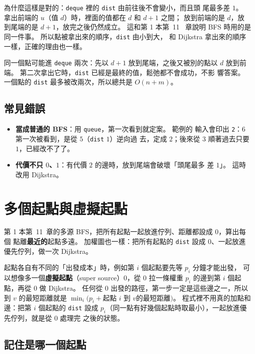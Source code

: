 為什麼這樣是對的：\texttt{deque} 裡的 \texttt{dist} 由前往後不會變小，而且頭
尾最多差 $1$。 拿出前端的 $u$（值 $d$）時，裡面的值都在 $d$ 和 $d + 1$ 之間；
放到前端的是 $d$，放到尾端的是 $d + 1$，放完之後仍然成立。 這和第 1 本第~11~
章說明 BFS 時用的是同一件事。 所以點被拿出來的順序，\texttt{dist} 由小到大，
和 Dijkstra 拿出來的順序一樣，正確的理由也一樣。

同一個點可能進 \texttt{deque} 兩次：先以 $d + 1$ 放到尾端，之後又被別的點以 $d$
放到前端。 第二次拿出它時，\texttt{dist} 已經是最終的值，鬆弛都不會成功，不影
響答案。 一個點的 \texttt{dist} 最多被改兩次，所以總共是 $O(n + m)$。

\subsection{常見錯誤}

\begin{itemize}
\item \textbf{當成普通的 BFS}：用 \texttt{queue}，第一次看到就定案。 範例的
輸入會印出 \texttt{2}：$6$ 第一次被看到，是從 $5$（\texttt{dist} $1$）逆向過
去，定成 $2$；後來從 $3$ 順著過去只要 $1$，已經改不了了。
\item \textbf{代價不只 $0$、$1$}：有代價 $2$ 的邊時，放到尾端會破壞「頭尾最多
差 $1$」。 這時改用 Dijkstra。
\end{itemize}

\section{多個起點與虛擬起點}
\label{sec:sp-multi}

第 1 本第~11~章的多源 BFS，把所有起點一起放進佇列、距離都設成 $0$，算出每個
點離\textbf{最近的}起點多遠。 加權圖也一樣：把所有起點的 \texttt{dist} 設成
$0$、一起放進優先佇列，做一次 Dijkstra。

起點各自有不同的「出發成本」時，例如第 $i$ 個起點要先等 $p_i$ 分鐘才能出發，
可以想像多一個\textbf{虛擬起點}（super source）$0$，從 $0$ 拉一條權重 $p_i$ 的邊到第 $i$ 個起
點，再從 $0$ 做 Dijkstra。 任何從 $0$ 出發的路徑，第一步一定是這些邊之一，所以
到 $v$ 的最短距離就是 $\min_i \bigl(p_i + \text{起點 } i \text{ 到 } v \text{
的最短距離}\bigr)$。 程式裡不用真的加點和邊：把第 $i$ 個起點的 \texttt{dist}
設成 $p_i$（同一點有好幾個起點時取最小），一起放進優先佇列，就是從 $0$ 處理完
之後的狀態。

\subsection{記住是哪一個起點}
\label{sec:sp-label}

